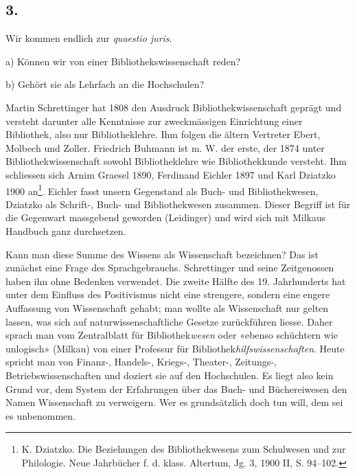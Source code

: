 \documentclass[a4paper,
fontsize=11pt,
oneside,
numbers=noperiodatend,
parskip=half-,
bibliography=totoc,
final
]{scrartcl}
\begin{document}
\hypertarget{section-2}{%
\subsection{3.}\label{section-2}}

Wir kommen endlich zur \emph{quaestio juris}.

a) Können wir von einer Bibliothekswissenschaft reden?

b) Gehört sie als Lehrfach an die Hochschulen?

Martin Schrettinger hat 1808 den Ausdruck Bibliothekwissenschaft geprägt
und versteht darunter alle Kenntnisse zur zweckmässigen Einrichtung
einer Bibliothek, also nur Bibliotheklehre. Ihm folgen die ältern
Vertreter Ebert, Molbech und Zoller. Friedrich Buhmann ist m. W. der
erste, der 1874 unter Bibliothekwissenschaft sowohl Bibliotheklehre wie
Bibliothekkunde versteht. Ihm schliessen sich Arnim Graesel 1890,
Ferdinand Eichler 1897 und Karl Dziatzko 1900 an\footnote{K. Dziatzko.
  Die Beziehungen des Bibliothekwesens zum Schulwesen und zur
  Philologie. Neue Jahrbücher f. d. klass. Altertum, Jg. 3, 1900 II, S.
  94--102.}. Eichler fasst unsern Gegenstand als Buch- und
Bibliothekwesen, Dziatzko als Schrift-, Buch- und Bibliothekwesen
zusammen. Dieser Begriff ist für die Gegenwart massgebend geworden
(Leidinger) und wird sich mit Milkaus Handbuch ganz durchsetzen.

Kann man diese Summe des Wissens als Wissenschaft bezeichnen? Das ist
zunächst eine Frage des Sprachgebrauchs. Schrettinger und seine
Zeitgenossen haben ihn ohne Bedenken verwendet. Die zweite Hälfte des
19. Jahrhunderts hat unter dem Einfluss des Positivismus nicht eine
strengere, sondern eine engere Auffassung von Wissenschaft gehabt; man
wollte als Wissenschaft nur gelten lassen, was sich auf
naturwissenschaftliche Gesetze zurückführen liesse. Daher sprach man vom
Zentralblatt für Bibliothek\emph{wesen} oder «ebenso schüchtern wie
unlogisch» (Milkau) von einer Professur für
Bibliothek\emph{hilfswissenschaften}. Heute spricht man von Finanz-,
Handels-, Kriegs-, Theater-, Zeitungs-, Betriebswissenschaften und
doziert sie auf den Hochschulen. Es liegt also kein Grund vor, dem
System der Erfahrungen über das Buch- und Büchereiwesen den Namen
Wissenschaft zu verweigern. Wer es grundsätzlich doch tun will, dem sei
es unbenommen.
\end{document}

